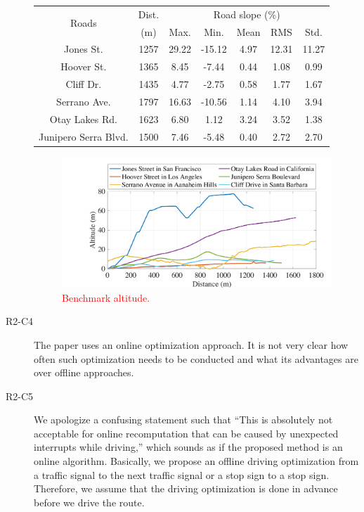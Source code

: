\documentclass[onecolumn]{IEEEconf}
\begin{document}
\begin{description}
\begin{table} [h!]
\centering
\label{table:road_bench}
\begin{tabular}{|c|c|c|c|c|c|c|}  \hline
\multirow{2}{*}{Roads} 
				&Dist.		&\multicolumn{5}{|c|}{Road slope (\%)}  \\ \cline{3-7}
				&(m)		 	&Max.		&Min. 	&Mean		&RMS 	&Std.	\\ \hline
Jones St. 	&1257		&29.22		&-15.12	&4.97 		&12.31 	&11.27	\\ \hline
Hoover St. 	&1365		&8.45		&-7.44	&0.44		&1.08 	&0.99	\\ \hline
Cliff Dr. 	&1435		&4.77		&-2.75	&0.58		&1.77 	&1.67	\\ \hline
Serrano Ave.		&1797		&16.63		&-10.56	&1.14 		&4.10 	&3.94	\\ \hline
Otay Lakes Rd.		&1623		&6.80		&1.12	&3.24		&3.52 	&1.38	\\ \hline
Junipero Serra Blvd.	&1500		&7.46		&-5.48	&0.40		&2.72 	&2.70	\\ \hline
\end{tabular}
\end{table}


\begin{figure} [h!]	 %
\centering
\renewcommand\thefigure{8}
\includegraphics[width=0.7\hsize]{Figures/Benchmark_altitude.pdf}
\caption{\textcolor{red}{Benchmark altitude.}}
\label{fig:bench_altitude}
\end{figure} 


\item [R2-C4] The paper uses an online optimization approach. It is not very clear how often such optimization needs to be conducted and what its advantages are over offline approaches.

\item [R2-C5] We apologize a confusing statement such that ``This is absolutely not acceptable for online recomputation that can be caused by unexpected interrupts while driving,'' which sounds as if the proposed method is an online algorithm. Basically, we propose an offline driving optimization from a traffic signal to the next traffic signal or  a stop sign to a stop sign. Therefore, we assume that the driving optimization is done in advance before we drive the route.


\end{description}
\end{document}
